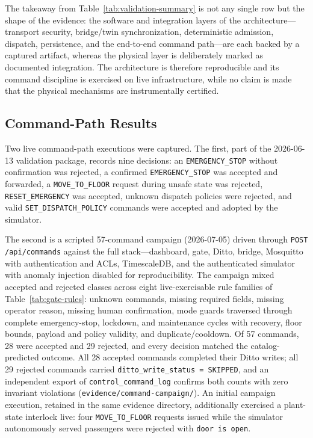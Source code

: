 \documentclass[journal]{IEEEtran}
\newcommand{\artifact}[1]{\texttt{#1}}
\begin{document}
The takeaway from Table~\ref{tab:validation-summary} is not any single row but the shape of the evidence: the software and integration layers of the architecture---transport security, bridge/twin synchronization, deterministic admission, dispatch, persistence, and the end-to-end command path---are each backed by a captured artifact, whereas the physical layer is deliberately marked as documented integration. The architecture is therefore reproducible and its command discipline is exercised on live infrastructure, while no claim is made that the physical mechanisms are instrumentally certified.

\subsection{Command-Path Results}

Two live command-path executions were captured. The first, part of the 2026-06-13 validation package, records nine decisions: an \artifact{EMERGENCY\_STOP} without confirmation was rejected, a confirmed \artifact{EMERGENCY\_STOP} was accepted and forwarded, a \artifact{MOVE\_TO\_FLOOR} request during unsafe state was rejected, \artifact{RESET\_EMERGENCY} was accepted, unknown dispatch policies were rejected, and valid \artifact{SET\_DISPATCH\_POLICY} commands were accepted and adopted by the simulator.

The second is a scripted 57-command campaign (2026-07-05) driven through \artifact{POST /api/commands} against the full stack---dashboard, gate, Ditto, bridge, Mosquitto with authentication and ACLs, TimescaleDB, and the authenticated simulator with anomaly injection disabled for reproducibility. The campaign mixed accepted and rejected classes across eight live-exercisable rule families of Table~\ref{tab:gate-rules}: unknown commands, missing required fields, missing operator reason, missing human confirmation, mode guards traversed through complete emergency-stop, lockdown, and maintenance cycles with recovery, floor bounds, payload and policy validity, and duplicate/cooldown. Of 57 commands, 28 were accepted and 29 rejected, and every decision matched the catalog-predicted outcome. All 28 accepted commands completed their Ditto writes; all 29 rejected commands carried \artifact{ditto\_write\_status = SKIPPED}, and an independent export of \artifact{control\_command\_log} confirms both counts with zero invariant violations (\artifact{evidence/\allowbreak command-campaign/}). An initial campaign execution, retained in the same evidence directory, additionally exercised a plant-state interlock live: four \artifact{MOVE\_TO\_FLOOR} requests issued while the simulator autonomously served passengers were rejected with \artifact{door is open}.
\end{document}
